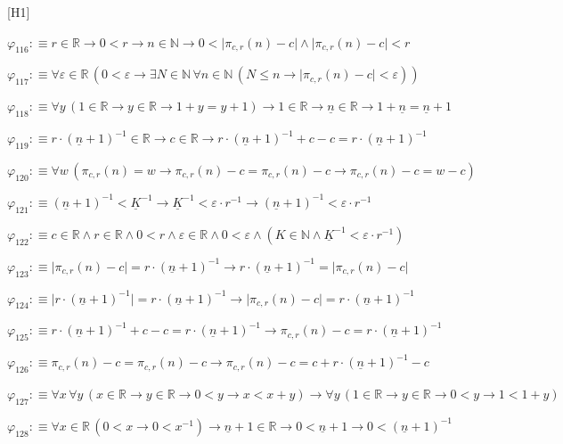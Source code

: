 \begin{fullproof}{[H1]}
\begin{abbrevlist}
\item $\varphi_{116} :\equiv r \in \mathbb{R} \to 0 < r \to n \in \mathbb{N} \to 0 < \lvert \pi_{c,r}(n) - c \rvert \land \lvert \pi_{c,r}(n) - c \rvert < r$
\item $\varphi_{117} :\equiv \forall \varepsilon \in \mathbb{R}\,(0 < \varepsilon \to \exists N \in \mathbb{N}\,\forall n \in \mathbb{N}\,(N \leq n \to \lvert \pi_{c,r}(n) - c \rvert < \varepsilon))$
\item $\varphi_{118} :\equiv \forall y\,(1 \in \mathbb{R} \to y \in \mathbb{R} \to 1 + y = y + 1) \to 1 \in \mathbb{R} \to \underline{n} \in \mathbb{R} \to 1 + \underline{n} = \underline{n} + 1$
\item $\varphi_{119} :\equiv r \cdot (\underline{n} + 1)^{-1} \in \mathbb{R} \to c \in \mathbb{R} \to r \cdot (\underline{n} + 1)^{-1} + c - c = r \cdot (\underline{n} + 1)^{-1}$
\item $\varphi_{120} :\equiv \forall w\,(\pi_{c,r}(n) = w \to \pi_{c,r}(n) - c = \pi_{c,r}(n) - c \to \pi_{c,r}(n) - c = w - c)$
\item $\varphi_{121} :\equiv (\underline{n} + 1)^{-1} < \underline{K}^{-1} \to \underline{K}^{-1} < \varepsilon \cdot r^{-1} \to (\underline{n} + 1)^{-1} < \varepsilon \cdot r^{-1}$
\item $\varphi_{122} :\equiv c \in \mathbb{R} \land r \in \mathbb{R} \land 0 < r \land \varepsilon \in \mathbb{R} \land 0 < \varepsilon \land (K \in \mathbb{N} \land \underline{K}^{-1} < \varepsilon \cdot r^{-1})$
\item $\varphi_{123} :\equiv \lvert \pi_{c,r}(n) - c \rvert = r \cdot (\underline{n} + 1)^{-1} \to r \cdot (\underline{n} + 1)^{-1} = \lvert \pi_{c,r}(n) - c \rvert$
\item $\varphi_{124} :\equiv \lvert r \cdot (\underline{n} + 1)^{-1} \rvert = r \cdot (\underline{n} + 1)^{-1} \to \lvert \pi_{c,r}(n) - c \rvert = r \cdot (\underline{n} + 1)^{-1}$
\item $\varphi_{125} :\equiv r \cdot (\underline{n} + 1)^{-1} + c - c = r \cdot (\underline{n} + 1)^{-1} \to \pi_{c,r}(n) - c = r \cdot (\underline{n} + 1)^{-1}$
\item $\varphi_{126} :\equiv \pi_{c,r}(n) - c = \pi_{c,r}(n) - c \to \pi_{c,r}(n) - c = c + r \cdot (\underline{n} + 1)^{-1} - c$
\item $\varphi_{127} :\equiv \forall x\,\forall y\,(x \in \mathbb{R} \to y \in \mathbb{R} \to 0 < y \to x < x + y) \to \forall y\,(1 \in \mathbb{R} \to y \in \mathbb{R} \to 0 < y \to 1 < 1 + y)$
\item $\varphi_{128} :\equiv \forall x \in \mathbb{R}\,(0 < x \to 0 < x^{-1}) \to \underline{n} + 1 \in \mathbb{R} \to 0 < \underline{n} + 1 \to 0 < (\underline{n} + 1)^{-1}$

\end{abbrevlist}
\end{fullproof}
